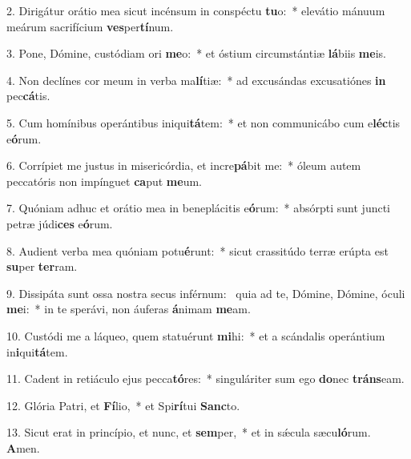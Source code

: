 2. Dirigátur orátio mea sicut incénsum in conspéctu \textbf{tu}o:~*  elevátio mánuum meárum sacrifícium \textbf{ves}per\textbf{tí}num.\

3. Pone, Dómine, custódiam ori \textbf{me}o:~*  et óstium circumstántiæ \textbf{lá}biis \textbf{me}is.\

4. Non declínes cor meum in verba ma\textbf{lí}tiæ:~*  ad excusándas excusatiónes \textbf{in} pec\textbf{cá}tis.\

5. Cum homínibus operántibus iniqui\textbf{tá}tem:~*  et non communicábo cum e\textbf{léc}tis e\textbf{ó}rum.\

6. Corrípiet me justus in misericórdia, et incre\textbf{pá}bit me:~*  óleum autem peccatóris non impínguet \textbf{ca}put \textbf{me}um.\

7. Quóniam adhuc et orátio mea in beneplácitis e\textbf{ó}rum:~*  absórpti sunt juncti petræ júdi\textbf{ces} e\textbf{ó}rum.\

8. Audient verba mea quóniam potu\textbf{é}runt:~*  sicut crassitúdo terræ erúpta est \textbf{su}per \textbf{ter}ram.\

9. Dissipáta sunt ossa nostra secus inférnum: \dag\  quia ad te, Dómine, Dómine, óculi \textbf{me}i:~*  in te sperávi, non áuferas \textbf{á}nimam \textbf{me}am.\

10. Custódi me a láqueo, quem statuérunt \textbf{mi}hi:~*  et a scándalis operántium in\textbf{i}qui\textbf{tá}tem.\

11. Cadent in retiáculo ejus pecca\textbf{tó}res:~*  singuláriter sum ego \textbf{do}nec \textbf{tráns}eam.\

12. Glória Patri, et \textbf{Fí}lio,~*  et Spi\textbf{rí}tui \textbf{Sanc}to.\

13. Sicut erat in princípio, et nunc, et \textbf{sem}per,~*  et in sǽcula sæcu\textbf{ló}rum. \textbf{A}men.\

